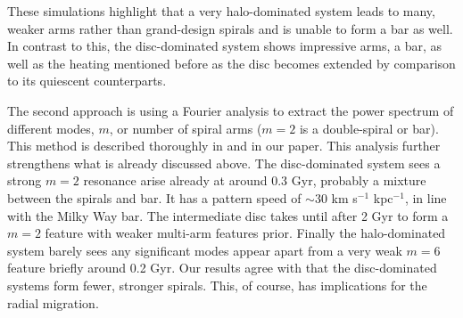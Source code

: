 These simulations highlight that a very halo-dominated system leads to many, weaker arms rather than grand-design spirals and is unable to form a bar as well. In contrast to this, the disc-dominated system shows impressive arms, a bar, as well as the heating mentioned before as the disc becomes extended by comparison to its quiescent counterparts.

The second approach is using a Fourier analysis to extract the power spectrum of different modes, $m$, or number of spiral arms ($m=2$ is a double-spiral or bar). This method is described thoroughly in \cite{roskar:12} and in our paper. This analysis further strengthens what is already discussed above. The disc-dominated system sees a strong $m=2$ resonance arise already at around 0.3 Gyr, probably a mixture between the spirals and bar. It has a pattern speed of ${\sim}30$ km s$^{-1}$ kpc$^{-1}$, in line with the Milky Way bar. The intermediate disc takes until after 2 Gyr to form a $m=2$ feature with weaker multi-arm features prior. Finally the halo-dominated system barely sees any significant modes appear apart from a very weak $m=6$ feature briefly around 0.2 Gyr. Our results agree with \cite{donghia:15} that the disc-dominated systems form fewer, stronger spirals. This, of course, has implications for the radial migration.

